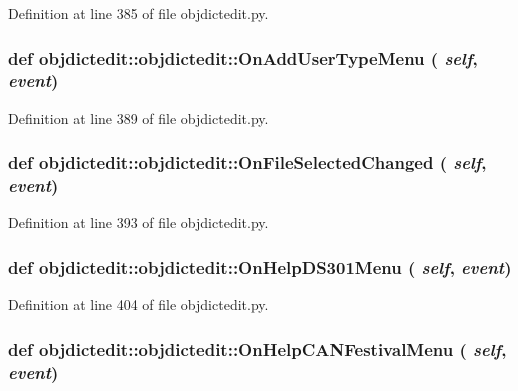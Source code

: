 Definition at line 385 of file objdictedit.py.\hypertarget{classobjdictedit_1_1objdictedit_666aae02d9569cfa32fc26329154da60}{
\subsubsection[OnAddUserTypeMenu]{\setlength{\rightskip}{0pt plus 5cm}def objdictedit::objdictedit::On\-Add\-User\-Type\-Menu ( {\em self},  {\em event})}}
\label{classobjdictedit_1_1objdictedit_666aae02d9569cfa32fc26329154da60}




Definition at line 389 of file objdictedit.py.\hypertarget{classobjdictedit_1_1objdictedit_8555948b7b1aecf2514b6b9ff4726635}{
\subsubsection[OnFileSelectedChanged]{\setlength{\rightskip}{0pt plus 5cm}def objdictedit::objdictedit::On\-File\-Selected\-Changed ( {\em self},  {\em event})}}
\label{classobjdictedit_1_1objdictedit_8555948b7b1aecf2514b6b9ff4726635}




Definition at line 393 of file objdictedit.py.\hypertarget{classobjdictedit_1_1objdictedit_8b0876dac5e3046f93854665bd9be3aa}{
\subsubsection[OnHelpDS301Menu]{\setlength{\rightskip}{0pt plus 5cm}def objdictedit::objdictedit::On\-Help\-DS301Menu ( {\em self},  {\em event})}}
\label{classobjdictedit_1_1objdictedit_8b0876dac5e3046f93854665bd9be3aa}




Definition at line 404 of file objdictedit.py.\hypertarget{classobjdictedit_1_1objdictedit_a498874fef86060832c7e90b6e028629}{
\subsubsection[OnHelpCANFestivalMenu]{\setlength{\rightskip}{0pt plus 5cm}def objdictedit::objdictedit::On\-Help\-CANFestival\-Menu ( {\em self},  {\em event})}}
\label{classobjdictedit_1_1objdictedit_a498874fef86060832c7e90b6e028629}




